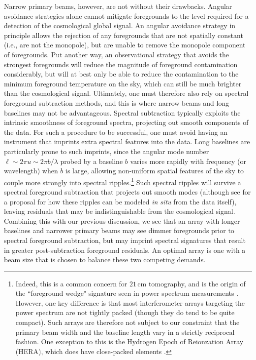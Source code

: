 \documentclass[twocolumn,apj,numberedappendix]{emulateapj}
\begin{document}
Narrow primary beams, however, are not without their drawbacks. Angular avoidance strategies alone cannot mitigate foregrounds to the level required for a detection of the cosmological global signal. An angular avoidance strategy in principle allows the rejection of any foregrounds that are not spatially constant (i.e., are not the monopole), but are unable to remove the monopole component of foregrounds. Put another way, an observational strategy that avoids the strongest foregrounds will reduce the magnitude of foreground contamination considerably, but will at best only be able to reduce the contamination to the minimum foreground temperature on the sky, which can still be much brighter than the cosmological signal. Ultimately, one must therefore also rely on spectral foreground subtraction methods, and this is where narrow beams and long baselines may not be advantageous. Spectral subtraction typically exploits the intrinsic smoothness of foreground spectra, projecting out smooth components of the data. For such a procedure to be successful, one must avoid having an instrument that imprints extra spectral features into the data. Long baselines are particularly prone to such imprints, since the angular mode number $\ell \sim 2 \pi u \sim 2 \pi b / \lambda$ probed by a baseline $b$ varies more rapidly with frequency (or wavelength) when $b$ is large, allowing non-uniform spatial features of the sky to couple more strongly into spectral ripples.\footnote{Indeed, this is a common concern for $21\,\textrm{cm}$ tomography, and is the origin of the ``foreground wedge" signature seen in power spectrum measurements \citep{DattaWedge,MoralesWedge,CathWedge,VedanthamWedge,AaronDelay,NithyaWedge,JonnieWedge,meWedge1,meWedge2}. However, one key difference is that most interferometer arrays targeting the power spectrum are not tightly packed (though they do tend to be quite compact). Such arrays are therefore not subject to our constraint that the primary beam width and the baseline length vary in a strictly reciprocal fashion. One exception to this is the Hydrogen Epoch of Reionzation Array (HERA), which does have close-packed elements \citep{JonnieHERA}.} Such spectral ripples will survive a spectral foreground subtraction that projects out smooth modes (although see \citealt{Liu_Switzer_2014} for a proposal for how these ripples can be modeled \emph{in situ} from the data itself), leaving residuals that may be indistinguishable from the cosmological signal. Combining this with our previous discussion, we see that an array with longer baselines and narrower primary beams may see dimmer foregrounds prior to spectral foreground subtraction, but may imprint spectral signatures that result in greater post-subtraction foreground residuals. An optimal array is one with a beam size that is chosen to balance these two competing demands.
\end{document}
